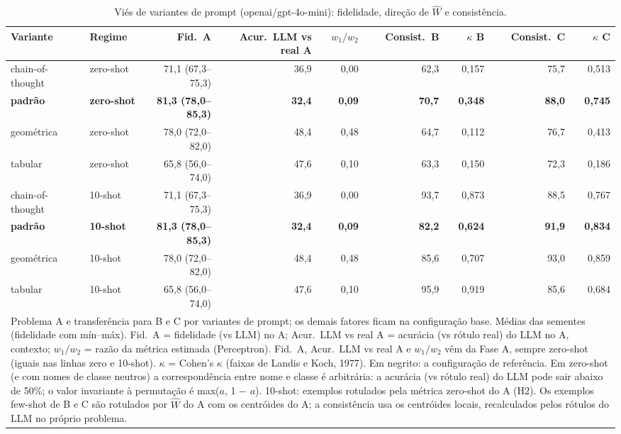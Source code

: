 \begin{table}[htbp]
\centering
\small
\caption{Viés de variantes de prompt (openai/gpt-4o-mini): fidelidade, direção de $\hat{W}$ e consistência.}
\label{tab:bloco1_vies_variantes_prompt_gpt4mini}
\begin{tabular}{llrrrrrrr}
\toprule
Variante & Regime & Fid.\ A & Acur.\ LLM vs real A & $w_1/w_2$ & Consist.\ B & $\kappa$ B & Consist.\ C & $\kappa$ C \\
\midrule
chain-of-thought & zero-shot & 71,1 (67,3–75,3) & 36,9 & 0,00 & 62,3 & 0,157 & 75,7 & 0,513 \\
\textbf{padrão} & \textbf{zero-shot} & \textbf{81,3 (78,0–85,3)} & \textbf{32,4} & \textbf{0,09} & \textbf{70,7} & \textbf{0,348} & \textbf{88,0} & \textbf{0,745} \\
geométrica & zero-shot & 78,0 (72,0–82,0) & 48,4 & 0,48 & 64,7 & 0,112 & 76,7 & 0,413 \\
tabular & zero-shot & 65,8 (56,0–74,0) & 47,6 & 0,10 & 63,3 & 0,150 & 72,3 & 0,186 \\
\midrule
chain-of-thought & 10-shot & 71,1 (67,3–75,3) & 36,9 & 0,00 & 93,7 & 0,873 & 88,5 & 0,767 \\
\textbf{padrão} & \textbf{10-shot} & \textbf{81,3 (78,0–85,3)} & \textbf{32,4} & \textbf{0,09} & \textbf{82,2} & \textbf{0,624} & \textbf{91,9} & \textbf{0,834} \\
geométrica & 10-shot & 78,0 (72,0–82,0) & 48,4 & 0,48 & 85,6 & 0,707 & 93,0 & 0,859 \\
tabular & 10-shot & 65,8 (56,0–74,0) & 47,6 & 0,10 & 95,9 & 0,919 & 85,6 & 0,684 \\
\bottomrule
\multicolumn{9}{p{0.95\linewidth}}{\footnotesize Problema A e transferência para B e C por variantes de prompt; os demais fatores ficam na configuração base. Médias das sementes (fidelidade com mín–máx). Fid.\ A = fidelidade (vs LLM) no A; Acur.\ LLM vs real A = acurácia (vs rótulo real) do LLM no A, contexto; $w_1/w_2$ = razão da métrica estimada (Perceptron). Fid.\ A, Acur.\ LLM vs real A e $w_1/w_2$ vêm da Fase A, sempre zero-shot (iguais nas linhas zero e 10-shot). $\kappa$ = Cohen's $\kappa$ (faixas de Landis e Koch, 1977). Em negrito: a configuração de referência. Em zero-shot (e com nomes de classe neutros) a correspondência entre nome e classe é arbitrária: a acurácia (vs rótulo real) do LLM pode sair abaixo de 50\%; o valor invariante à permutação é max($a$, 1 $-$ $a$). 10-shot: exemplos rotulados pela métrica zero-shot do A (H2). Os exemplos few-shot de B e C são rotulados por $\hat{W}$ do A com os centróides do A; a consistência usa os centróides locais, recalculados pelos rótulos do LLM no próprio problema.} \\
\end{tabular}
\end{table}
